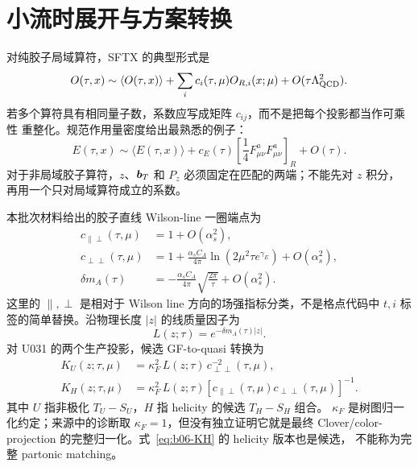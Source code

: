 \section{小流时展开与方案转换}

对纯胶子局域算符，SFTX 的典型形式是
\begin{equation}
  O(\tau,x)
  \sim \langle O(\tau,x)\rangle
  +\sum_i c_i(\tau,\mu)O_{R,i}(x;\mu)
  +O(\tau\Lambda_{\rm QCD}^2).
  \label{eq:b06-sftx-general}
\end{equation}
若多个算符具有相同量子数，系数应写成矩阵 \(c_{ij}\)，而不是把每个投影都当作可乘性
重整化。规范作用量密度给出最熟悉的例子：
\begin{equation}
  E(\tau,x)
  \sim \langle E(\tau,x)\rangle
  +c_E(\tau)\left[\frac14F^a_{\mu\nu}F^a_{\mu\nu}\right]_R
  +O(\tau).
  \label{eq:b06-sftx-energy}
\end{equation}
对于非局域胶子算符，\(z\)、\(\boldsymbol b_T\) 和 \(P_z\) 必须固定在匹配的两端；不能先对 \(z\) 积分，
再用一个只对局域算符成立的系数。

本批次材料给出的胶子直线 Wilson-line 一圈端点为
\begin{align}
  c_{\parallel\perp}(\tau,\mu)
  &=1+O(\alpha_s^2),
  \label{eq:b06-c-parperp}\\
  c_{\perp\perp}(\tau,\mu)
  &=1+\frac{\alpha_s C_A}{4\pi}
  \ln\left(2\mu^2\tau e^{\gamma_E}\right)
  +O(\alpha_s^2),
  \label{eq:b06-c-perpperp}\\
  \delta m_A(\tau)
  &=-\frac{\alpha_s C_A}{4\pi}\sqrt{\frac{2\pi}{\tau}}
  +O(\alpha_s^2).
  \label{eq:b06-line-mass}
\end{align}
这里的 \(\parallel,\perp\) 是相对于 Wilson line 方向的场强指标分类，不是格点代码中
\(t,i\) 标签的简单替换。沿物理长度 \(|z|\) 的线质量因子为
\begin{equation}
  L(z;\tau)=e^{-\delta m_A(\tau)|z|}.
  \label{eq:b06-line-factor}
\end{equation}
对 U031 的两个生产投影，候选 GF-to-quasi 转换为
\begin{align}
  K_U(z;\tau,\mu)
  &=\kappa_F^2\,L(z;\tau)\,c_{\perp\perp}^{-2}(\tau,\mu),
  \label{eq:b06-KU}\\
  K_H(z;\tau,\mu)
  &=\kappa_F^2\,L(z;\tau)
  \left[c_{\parallel\perp}(\tau,\mu)c_{\perp\perp}(\tau,\mu)\right]^{-1}.
  \label{eq:b06-KH}
\end{align}
其中 \(U\) 指非极化 \(T_U-S_U\)，\(H\) 指 helicity 的候选 \(T_H-S_H\) 组合。
\(\kappa_F\) 是树图归一化约定；来源中的诊断取 \(\kappa_F=1\)，但没有独立证明它就是最终
Clover/color-projection 的完整归一化。式~\eqref{eq:b06-KH} 的 helicity 版本也是候选，
不能称为完整 partonic matching。

